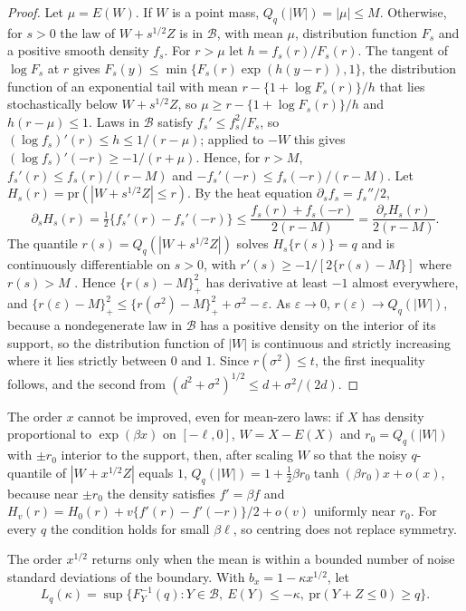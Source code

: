 \documentclass[12pt]{article}
\renewcommand{\_}{\usc\allowbreak}
\theoremstyle{definition}
\numberwithin{equation}{section}
\newcommand{\pr}{\mathrm{pr}}
\newcommand{\B}{\mathcal{B}}
\begin{document}
\begin{proof}
Let $\mu = E(W)$. If $W$ is a point mass, $Q_q(|W|) = |\mu| \le M$. Otherwise, for $s > 0$ the law of $W + s^{1/2}Z$ is in $\B$, with mean $\mu$, distribution function $F_s$ and a positive smooth density $f_s$. For $r > \mu$ let $h = f_s(r)/F_s(r)$. The tangent of $\log F_s$ at $r$ gives $F_s(y) \le \min\{F_s(r)\exp(h(y - r)), 1\}$, the distribution function of an exponential tail with mean $r - \{1 + \log F_s(r)\}/h$ that lies stochastically below $W + s^{1/2}Z$, so $\mu \ge r - \{1 + \log F_s(r)\}/h$ and $h(r - \mu) \le 1$. Laws in $\B$ satisfy $f_s' \le f_s^2/F_s$, so $(\log f_s)'(r) \le h \le 1/(r - \mu)$; applied to $-W$ this gives $(\log f_s)'(-r) \ge -1/(r + \mu)$. Hence, for $r > M$, $f_s'(r) \le f_s(r)/(r - M)$ and $-f_s'(-r) \le f_s(-r)/(r - M)$. Let $H_s(r) = \pr(|W + s^{1/2}Z| \le r)$. By the heat equation $\partial_sf_s = f_s''/2$,
\[
\partial_sH_s(r) = \tfrac12\{f_s'(r) - f_s'(-r)\} \le \frac{f_s(r) + f_s(-r)}{2(r - M)} = \frac{\partial_rH_s(r)}{2(r - M)}.
\]
The quantile $r(s) = Q_q(|W + s^{1/2}Z|)$ solves $H_s\{r(s)\} = q$ and is continuously differentiable on $s > 0$, with $r'(s) \ge -1/[2\{r(s) - M\}]$ where $r(s) > M$ \citep{steinbrecher2008}. Hence $\{r(s) - M\}_+^2$ has derivative at least $-1$ almost everywhere, and $\{r(\varepsilon) - M\}_+^2 \le \{r(\sigma^2) - M\}_+^2 + \sigma^2 - \varepsilon$. As $\varepsilon \to 0$, $r(\varepsilon) \to Q_q(|W|)$, because a nondegenerate law in $\B$ has a positive density on the interior of its support, so the distribution function of $|W|$ is continuous and strictly increasing where it lies strictly between $0$ and $1$. Since $r(\sigma^2) \le t$, the first inequality follows, and the second from $(d^2 + \sigma^2)^{1/2} \le d + \sigma^2/(2d)$.
\end{proof}

The order $x$ cannot be improved, even for mean-zero laws: if $X$ has density proportional to $\exp(\beta x)$ on $[-\ell, 0]$, $W = X - E(X)$ and $r_0 = Q_q(|W|)$ with $\pm r_0$ interior to the support, then, after scaling $W$ so that the noisy $q$-quantile of $|W + x^{1/2}Z|$ equals $1$, $Q_q(|W|) = 1 + \tfrac12\beta r_0\tanh(\beta r_0)x + o(x)$, because near $\pm r_0$ the density satisfies $f' = \beta f$ and $H_v(r) = H_0(r) + v\{f'(r) - f'(-r)\}/2 + o(v)$ uniformly near $r_0$. For every $q$ the condition holds for small $\beta\ell$, so centring does not replace symmetry.

The order $x^{1/2}$ returns only when the mean is within a bounded number of noise standard deviations of the boundary. With $b_x = 1 - \kappa x^{1/2}$, let
\[
L_q(\kappa) = \sup\{F_Y^{-1}(q) : Y \in \B,\ E(Y) \le -\kappa,\ \pr(Y + Z \le 0) \ge q\}.
\]
\end{document}
